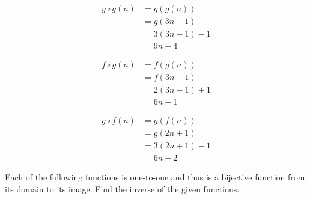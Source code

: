 \documentclass[addpoints]{exam}
\newcommand{\reals}{\mathbb{R}}
\begin{document}
\begin{questions}
\begin{solution}
    \begin{align*}
      g\circ g(n) &= g(g(n))\\
      &= g(3n-1)\\
      &= 3(3n-1) - 1\\
      &= 9n - 4
    \end{align*}

    \begin{align*}
      f\circ g(n) &= f(g(n))\\
      &= f(3n-1)\\
      &= 2(3n-1) + 1\\
      &= 6n- 1
    \end{align*}

    \begin{align*}
      g\circ f(n) &= g(f(n))\\
      &= g(2n+1)\\
      &= 3(2n+1) - 1\\
      &= 6n + 2
    \end{align*}
  \end{solution}

  \question Each of the following functions is one-to-one and thus is a
  bijective function from its domain to its image. Find the inverse of the
  given functions.


\end{questions}
\end{document}
